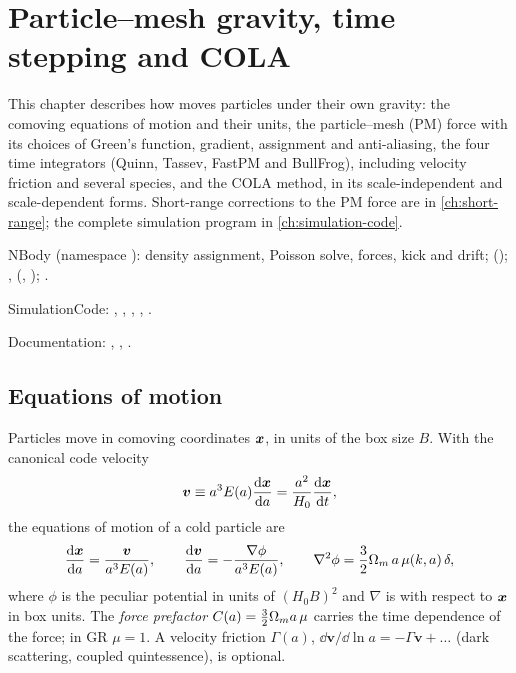 \chapter{Particle--mesh gravity, time stepping and COLA}\label{ch:nbody-pm}

This chapter describes how \fml{} moves particles under their own gravity: the comoving equations of motion and their
units, the particle--mesh (PM) force with its choices of Green's function, gradient, assignment and anti-aliasing,
the four time integrators (Quinn, Tassev, FastPM and BullFrog), including velocity friction and several species, and
the COLA method, in its scale-independent and scale-dependent forms. Short-range corrections to the PM force are in
\cref{ch:short-range}; the complete simulation program in \cref{ch:simulation-code}.

\begin{modulebox}{NBody}
 (namespace ): density assignment, Poisson solve, forces, kick and drift;
 (); , 
(, ); .\par
SimulationCode: , , , ,
.\par
Documentation: , , .
\end{modulebox}

\section{Equations of motion}\label{sec:nbody-eom}

Particles move in comoving coordinates $\bm{x}$, in units of the box size $B$. With the canonical code velocity
\begin{equation}
\bm v\equiv a^3E(a)\frac{\mathrm{d}\bm{x}}{\mathrm{d} a}=\frac{a^2}{H_0}\frac{\mathrm{d}\bm{x}}{\mathrm{d} t},
\end{equation}
the equations of motion of a cold particle are
\begin{equation}
\frac{\mathrm{d}\bm{x}}{\mathrm{d} a}=\frac{\bm v}{a^3E(a)},\qquad \frac{\mathrm{d}\bm v}{\mathrm{d} a}=-\frac{\nabla\phi}{a^3E(a)},\qquad
\nabla^2\phi=\frac32\Omega_m\,a\,\mu(k,a)\,\delta,
\label{eq:nbody-eom}
\end{equation}
where $\phi$ is the peculiar potential in units of $(H_0B)^2$ and $\nabla$ is with respect to $\bm{x}$ in box units. The
\emph{force prefactor} $C(a)=\frac32\Omega_ma\,\mu$ carries the time dependence of the force; in GR $\mu=1$. A velocity
friction $\Gamma(a)$, $\dd\bm v/\dd\ln a=-\Gamma\bm v+\ldots$ (dark scattering, coupled quintessence), is optional.

